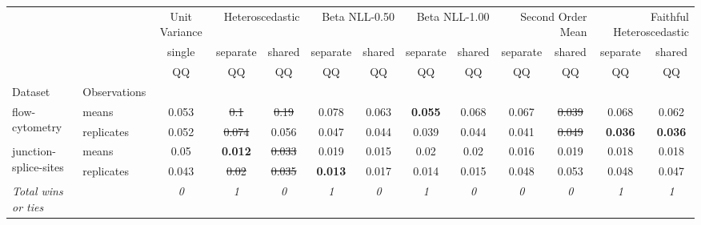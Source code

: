 \begin{tabular}{ll|c|cc|cc|cc|cc|cc}
\toprule
{} & {} & {Unit Variance} & \multicolumn{2}{r}{Heteroscedastic} & \multicolumn{2}{r}{Beta NLL-0.50} & \multicolumn{2}{r}{Beta NLL-1.00} & \multicolumn{2}{r}{Second Order Mean} & \multicolumn{2}{r}{Faithful Heteroscedastic} \\
{} & {} & {single} & {separate} & {shared} & {separate} & {shared} & {separate} & {shared} & {separate} & {shared} & {separate} & {shared} \\
{} & {} & {QQ} & {QQ} & {QQ} & {QQ} & {QQ} & {QQ} & {QQ} & {QQ} & {QQ} & {QQ} & {QQ} \\
{Dataset} & {Observations} & {} & {} & {} & {} & {} & {} & {} & {} & {} & {} & {} \\
\midrule
\multirow[c]{2}{*}{flow-cytometry} & means & 0.053 & \sout{0.1} & \sout{0.19} & 0.078 & 0.063 & \textbf{0.055} & 0.068 & 0.067 & \sout{0.039} & 0.068 & 0.062 \\
 & replicates & 0.052 & \sout{0.074} & 0.056 & 0.047 & 0.044 & 0.039 & 0.044 & 0.041 & \sout{0.049} & \textbf{0.036} & \textbf{0.036} \\
\multirow[c]{2}{*}{junction-splice-sites} & means & 0.05 & \textbf{0.012} & \sout{0.033} & 0.019 & 0.015 & 0.02 & 0.02 & 0.016 & 0.019 & 0.018 & 0.018 \\
 & replicates & 0.043 & \sout{0.02} & \sout{0.035} & \textbf{0.013} & 0.017 & 0.014 & 0.015 & 0.048 & 0.053 & 0.048 & 0.047 \\
\textit{{Total wins or ties}} &  & \textit{0} & \textit{1} & \textit{0} & \textit{1} & \textit{0} & \textit{1} & \textit{0} & \textit{0} & \textit{0} & \textit{1} & \textit{1} \\
\bottomrule
\end{tabular}
